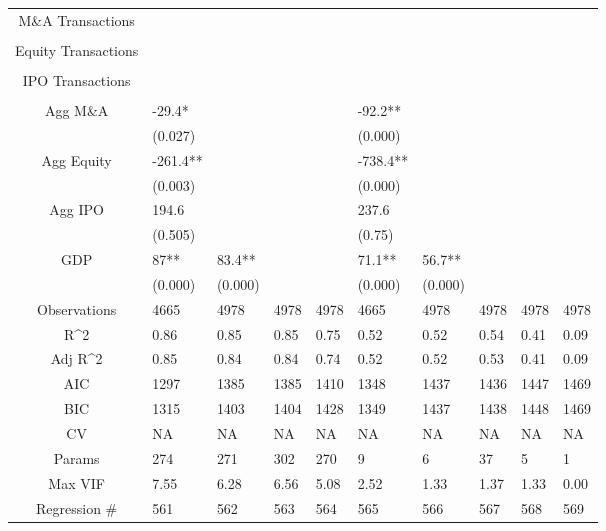 \documentclass{article}
\begin{document}
\begin{table}[H]
\begin{tabular}{|clllllllll|}
  M\&A Transactions &  &  &  &  &  &  &  &  &  \\
   &  &  &  &  &  &  &  &  &  \\
  Equity Transactions &  &  &  &  &  &  &  &  &  \\
   &  &  &  &  &  &  &  &  &  \\
  IPO Transactions &  &  &  &  &  &  &  &  &  \\
   &  &  &  &  &  &  &  &  &  \\
  Agg M\&A & -29.4* &  &  &  & -92.2** &  &  &  &  \\
   & (0.027) &  &  &  & (0.000) &  &  &  &  \\
  Agg Equity & -261.4** &  &  &  & -738.4** &  &  &  &  \\
   & (0.003) &  &  &  & (0.000) &  &  &  &  \\
  Agg IPO & 194.6 &  &  &  & 237.6 &  &  &  &  \\
   & (0.505) &  &  &  & (0.75) &  &  &  &  \\
  GDP & 87** & 83.4** &  &  & 71.1** & 56.7** &  &  &  \\
   & (0.000) & (0.000) &  &  & (0.000) & (0.000) &  &  &  \\
  \hline
 Observations & 4665 & 4978 & 4978 & 4978 & 4665 & 4978 & 4978 & 4978 & 4978 \\
  R^2 & 0.86 & 0.85 & 0.85 & 0.75 & 0.52 & 0.52 & 0.54 & 0.41 & 0.09 \\
  Adj R^2 & 0.85 & 0.84 & 0.84 & 0.74 & 0.52 & 0.52 & 0.53 & 0.41 & 0.09 \\
  AIC & 1297 & 1385 & 1385 & 1410 & 1348 & 1437 & 1436 & 1447 & 1469 \\
  BIC & 1315 & 1403 & 1404 & 1428 & 1349 & 1437 & 1438 & 1448 & 1469 \\
  CV & NA & NA & NA & NA & NA & NA & NA & NA & NA \\
  Params & 274 & 271 & 302 & 270 & 9 & 6 & 37 & 5 & 1 \\
  Max VIF & 7.55 & 6.28 & 6.56 & 5.08 & 2.52 & 1.33 & 1.37 & 1.33 & 0.00 \\
  Regression \# & 561 & 562 & 563 & 564 & 565 & 566 & 567 & 568 & 569 \\
   \hline
\end{tabular}

\end{table}
\end{document}

